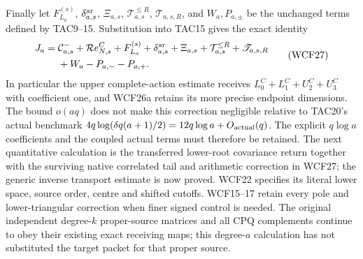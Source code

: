 Finally let $F_{L_a}^{(s)}$, $\delta^{\rm ar}_{a,s}$, $\Xi_{a,s}$,
$\mathcal T^{\le R}_{a,s}$, $\mathscr T_{a,s,R}$, and $W_a,P_{a,\pm}$
be the unchanged terms defined by TAC9--15. Substitution into TAC15
gives the exact identity
\[
 \begin{split}
 J_a={}&\mathcal C^-_{a,s}+\mathcal R e^C_{N,s}
      +F_{L_a}^{(s)}+\delta^{\rm ar}_{a,s}+\Xi_{a,s}
      +\mathcal T^{\le R}_{a,s}+\mathscr T_{a,s,R}\\
      &+W_a-P_{a,-}-P_{a,+}.
 \end{split}\tag{WCF27}
\]
In particular the upper complete-action estimate receives
$L_0^C+L_1^C+U_2^C+U_3^C$ with coefficient one, and WCF26a retains
its more precise endpoint dimensions. The bound $o(aq)$ does not make
this correction negligible relative to TAC20's actual benchmark
$4q\log(\delta q(a+1)/2)=12q\log a+O_{\rm actual}(q)$.
The explicit $q\log a$ coefficients and the coupled actual terms must
therefore be retained. The next quantitative calculation is the
transferred lower-root covariance return together with the surviving
native correlated tail and arithmetic correction in WCF27; the generic
inverse transport estimate is now proved. WCF22 specifies its literal
lower space, source order, centre and shifted cutoffs. WCF15--17 retain
every pole and lower-triangular correction when finer signed control is
needed. The original independent
degree-$k$ proper-source matrices and all CPQ complements continue to
obey their existing exact receiving maps; this degree-$a$ calculation
has not substituted the target packet for that proper source.
\endgroup
